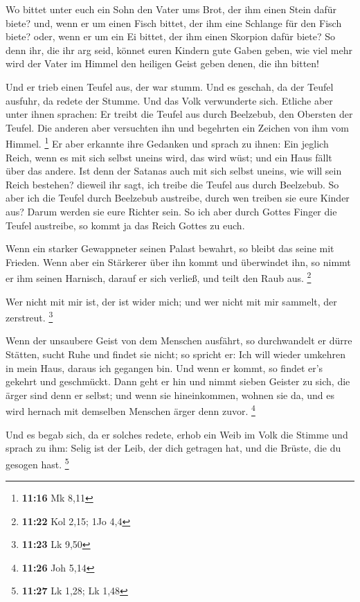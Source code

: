  Wo bittet unter euch ein Sohn den Vater ums Brot, der
ihm einen Stein dafür biete? und, wenn er um einen Fisch bittet, der ihm
eine Schlange für den Fisch biete?  oder, wenn er um ein
Ei bittet, der ihm einen Skorpion dafür biete?  So denn
ihr, die ihr arg seid, könnet euren Kindern gute Gaben geben, wie viel
mehr wird der Vater im Himmel den heiligen Geist geben denen, die ihn
bitten!

 Und er trieb einen Teufel aus, der war stumm. Und es
geschah, da der Teufel ausfuhr, da redete der Stumme. Und das Volk
verwunderte sich.  Etliche aber unter ihnen sprachen: Er
treibt die Teufel aus durch Beelzebub, den Obersten der Teufel.
 Die anderen aber versuchten ihn und begehrten ein
Zeichen von ihm vom Himmel. \footnote{\textbf{11:16} Mk 8,11}
 Er aber erkannte ihre Gedanken und sprach zu ihnen: Ein
jeglich Reich, wenn es mit sich selbst uneins wird, das wird wüst; und
ein Haus fällt über das andere.  Ist denn der Satanas
auch mit sich selbst uneins, wie will sein Reich bestehen? dieweil ihr
sagt, ich treibe die Teufel aus durch Beelzebub.  So aber
ich die Teufel durch Beelzebub austreibe, durch wen treiben sie eure
Kinder aus? Darum werden sie eure Richter sein.  So ich
aber durch Gottes Finger die Teufel austreibe, so kommt ja das Reich
Gottes zu euch.

 Wenn ein starker Gewappneter seinen Palast bewahrt, so
bleibt das seine mit Frieden.  Wenn aber ein Stärkerer
über ihn kommt und überwindet ihn, so nimmt er ihm seinen Harnisch,
darauf er sich verließ, und teilt den Raub aus. \footnote{\textbf{11:22}
  Kol 2,15; 1Jo 4,4}

 Wer nicht mit mir ist, der ist wider mich; und wer nicht
mit mir sammelt, der zerstreut. \footnote{\textbf{11:23} Lk 9,50}

 Wenn der unsaubere Geist von dem Menschen ausfährt, so
durchwandelt er dürre Stätten, sucht Ruhe und findet sie nicht; so
spricht er: Ich will wieder umkehren in mein Haus, daraus ich gegangen
bin.  Und wenn er kommt, so findet er's gekehrt und
geschmückt.  Dann geht er hin und nimmt sieben Geister zu
sich, die ärger sind denn er selbst; und wenn sie hineinkommen, wohnen
sie da, und es wird hernach mit demselben Menschen ärger denn zuvor.
\footnote{\textbf{11:26} Joh 5,14}

 Und es begab sich, da er solches redete, erhob ein Weib
im Volk die Stimme und sprach zu ihm: Selig ist der Leib, der dich
getragen hat, und die Brüste, die du gesogen hast. \footnote{\textbf{11:27}
  Lk 1,28; Lk 1,48}

